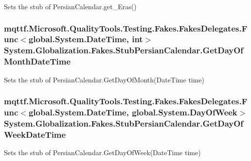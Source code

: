 Sets the stub of Persian\-Calendar.\-get\-\_\-\-Eras()

\hypertarget{class_system_1_1_globalization_1_1_fakes_1_1_stub_persian_calendar_a6e48c439b45e320cf8c445e62ad5841f}{
\subsubsection[{Get\-Day\-Of\-Month\-Date\-Time}]{\setlength{\rightskip}{0pt plus 5cm}mqttf.\-Microsoft.\-Quality\-Tools.\-Testing.\-Fakes.\-Fakes\-Delegates.\-Func$<$global.\-System.\-Date\-Time, int$>$ System.\-Globalization.\-Fakes.\-Stub\-Persian\-Calendar.\-Get\-Day\-Of\-Month\-Date\-Time}}\label{class_system_1_1_globalization_1_1_fakes_1_1_stub_persian_calendar_a6e48c439b45e320cf8c445e62ad5841f}


Sets the stub of Persian\-Calendar.\-Get\-Day\-Of\-Month(\-Date\-Time time)

\hypertarget{class_system_1_1_globalization_1_1_fakes_1_1_stub_persian_calendar_ae474d144f1db340011b65ae32faa87fb}{
\subsubsection[{Get\-Day\-Of\-Week\-Date\-Time}]{\setlength{\rightskip}{0pt plus 5cm}mqttf.\-Microsoft.\-Quality\-Tools.\-Testing.\-Fakes.\-Fakes\-Delegates.\-Func$<$global.\-System.\-Date\-Time, global.\-System.\-Day\-Of\-Week$>$ System.\-Globalization.\-Fakes.\-Stub\-Persian\-Calendar.\-Get\-Day\-Of\-Week\-Date\-Time}}\label{class_system_1_1_globalization_1_1_fakes_1_1_stub_persian_calendar_ae474d144f1db340011b65ae32faa87fb}


Sets the stub of Persian\-Calendar.\-Get\-Day\-Of\-Week(\-Date\-Time time)

